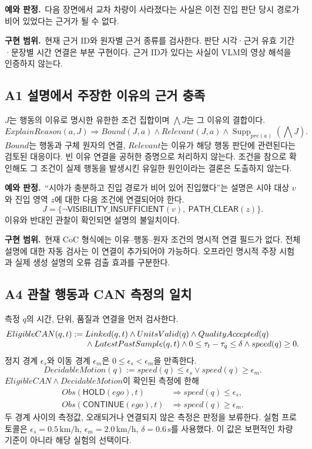 \documentclass[11pt,a4paper]{article}
\newcommand{\pred}[1]{\mathsf{#1}}
\newcommand{\supp}{\operatorname{Supp}}
\newcommand{\example}{\par\textbf{예와 판정.}\ }
\newcommand{\impl}{\par\textbf{구현 범위.}\ }
\begin{document}
\example 다음 장면에서 교차 차량이 사라졌다는 사실은
이전 진입 판단 당시 경로가 비어 있었다는 근거가 될 수 없다.
\impl 현재 근거 ID와 원자별 근거 종류를 검사한다.
판단 시각·근거 유효 기간·문장별 시간 연결은 부분 구현이다.
근거 ID가 있다는 사실이 VLM의 영상 해석을 인증하지 않는다.

\subsection{A1 설명에서 주장한 이유의 근거 충족}\label{prop:a1}
$J$는 행동의 이유로 명시한 유한한 조건 집합이며
$\bigwedge J$는 그 이유의 결합이다.
\begin{equation}
 ExplainReason(a,J)\Rightarrow
 Bound(J,a)\land Relevant(J,a)\land\supp_{pre(a)}\!\left(\bigwedge J\right).
 \label{eq:a1}
\end{equation}
$Bound$는 행동과 구체 원자의 연결,
$Relevant$는 이유가 해당 행동 판단에 관련된다는 검토된 대응이다.
빈 이유 연결을 공허한 증명으로 처리하지 않는다.
조건을 참으로 확인해도 그 조건이 실제 행동을 발생시킨 유일한 원인이라는 결론은 도출하지 않는다.

\example ``시야가 충분하고 진입 경로가 비어 있어 진입했다''는 설명은
시야 대상 $v$와 진입 영역 $z$에 대한 다음 조건에 연결되어야 한다.
\[
 J=\{\neg\pred{VISIBILITY\_INSUFFICIENT}(v),\ \pred{PATH\_CLEAR}(z)\}.
\]
이유와 반대인 관찰이 확인되면 설명의 불일치이다.
\impl 현재 CoC 형식에는 이유--행동--원자 조건의 명시적 연결 필드가 없다.
전체 설명에 대한 자동 검사는 이 연결이 추가되어야 가능하다.
오프라인 명시적 주장 시험과 실제 생성 설명의 오류 검출 효과를 구분한다.

\subsection{A4 관찰 행동과 CAN 측정의 일치}\label{prop:a4}
측정 $q$의 시간, 단위, 품질과 연결을 먼저 검사한다.
\begin{align}
 EligibleCAN(q,t):={}&Linked(q,t)\land UnitsValid(q)\land QualityAccepted(q)\notag\\[-0.3em]
 &\land LatestPastSample(q,t)\land 0\le\tau_t-\tau_q\le\delta
 \land speed(q)\ge0.
\end{align}
정지 경계 $\epsilon_s$와 이동 경계 $\epsilon_m$은
$0\le\epsilon_s<\epsilon_m$을 만족한다.
\begin{equation}
 DecidableMotion(q):=speed(q)\le\epsilon_s\lor speed(q)\ge\epsilon_m.
\end{equation}
$EligibleCAN\land DecidableMotion$이 확인된 측정에 한해
\begin{align}
 Obs(\pred{HOLD}(ego),t)&\Rightarrow speed(q)\le\epsilon_s,\label{eq:a4hold}\\
 Obs(\pred{CONTINUE}(ego),t)&\Rightarrow speed(q)\ge\epsilon_m.\label{eq:a4continue}
\end{align}
두 경계 사이의 측정값, 오래되거나 연결되지 않은 측정은 판정을 보류한다.
실험 프로토콜은 $\epsilon_s=0.5\,\mathrm{km/h}$,
$\epsilon_m=2.0\,\mathrm{km/h}$, $\delta=0.6\,\mathrm{s}$를 사용했다.
이 값은 보편적인 차량 기준이 아니라 해당 실험의 선택이다.
\end{document}
